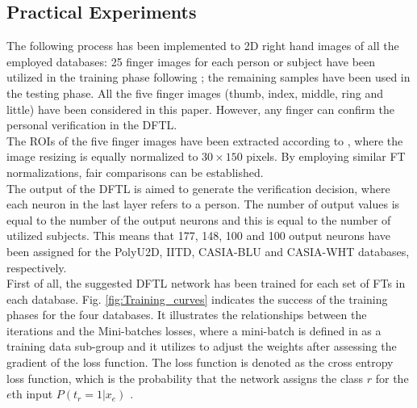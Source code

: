\documentclass[conference]{IEEEtran}
\begin{document}
\subsection{Practical Experiments}
The following process has been implemented to 2D right hand images of all the employed databases: 25 finger images for each person or subject have been utilized in the training phase following \cite{Al-Nima2016Robust} \cite{Al-Nima2017efficient} \cite{Al-Nima2017finger}; the remaining samples have been used in the testing phase. All the five finger images (thumb, index, middle, ring and little) have been considered in this paper. However, any finger can confirm the personal verification in the DFTL.\\
The ROIs of the five finger images have been extracted according to \cite{Al-Nima2016Robust} \cite{Al-Nima2017finger}, where the image resizing is equally normalized to $30\times 150$ pixels. By employing similar FT normalizations, fair comparisons can be established. \\
The output of the DFTL is aimed to generate the verification decision, where each neuron in the last layer refers to a person. The number of output values is equal to the number of the output neurons and this is equal to the number of utilized subjects. This means that 177, 148, 100 and 100 output neurons have been assigned for the PolyU2D, IITD, CASIA-BLU and CASIA-WHT databases, respectively. \\
First of all, the suggested DFTL network has been trained for each set of FTs in each database. Fig. \ref{fig:Training_curves} indicates the success of the training phases for the four databases. It illustrates the relationships between the iterations and the Mini-batches losses, where a mini-batch is defined in \cite{beale1992neural} as a training data sub-group and it utilizes to adjust the weights after assessing the gradient of the loss function. The loss function is denoted as the cross entropy loss function, which is the probability that the network assigns the class $r$ for the $e$th input $P(t_r=1|x_e)$ \cite{beale1992neural}.
\end{document}
